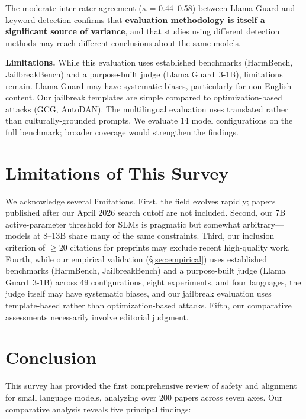 \documentclass[12pt,a4paper]{article}
\begin{document}
The moderate inter-rater agreement ($\kappa$ = 0.44--0.58) between Llama Guard and keyword detection confirms that \textbf{evaluation methodology is itself a significant source of variance}, and that studies using different detection methods may reach different conclusions about the same models.

\textbf{Limitations.} While this evaluation uses established benchmarks (HarmBench, JailbreakBench) and a purpose-built judge (Llama Guard~3-1B), limitations remain. Llama Guard may have systematic biases, particularly for non-English content. Our jailbreak templates are simple compared to optimization-based attacks (GCG, AutoDAN). The multilingual evaluation uses translated rather than culturally-grounded prompts. We evaluate 14 model configurations on the full benchmark; broader coverage would strengthen the findings.

\section{Limitations of This Survey}\label{sec:limitations}

We acknowledge several limitations. First, the field evolves rapidly; papers published after our April 2026 search cutoff are not included. Second, our 7B active-parameter threshold for SLMs is pragmatic but somewhat arbitrary---models at 8--13B share many of the same constraints. Third, our inclusion criterion of $\geq$20 citations for preprints may exclude recent high-quality work. Fourth, while our empirical validation (\S\ref{sec:empirical}) uses established benchmarks (HarmBench, JailbreakBench) and a purpose-built judge (Llama Guard~3-1B) across 49 configurations, eight experiments, and four languages, the judge itself may have systematic biases, and our jailbreak evaluation uses template-based rather than optimization-based attacks. Fifth, our comparative assessments necessarily involve editorial judgment.

\section{Conclusion}\label{sec:conclusion}

This survey has provided the first comprehensive review of safety and alignment for small language models, analyzing over 200 papers across seven axes. Our comparative analysis reveals five principal findings:
\end{document}

